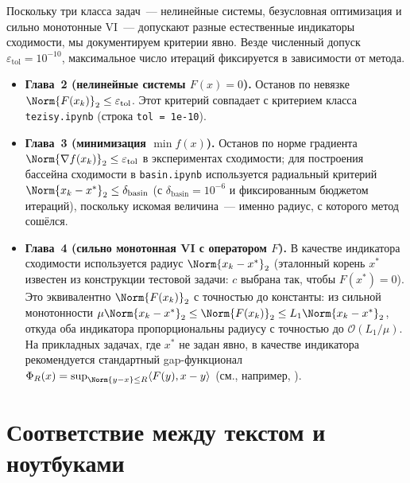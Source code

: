 Поскольку три класса задач~--- нелинейные системы, безусловная
оптимизация и сильно монотонные VI~--- допускают разные естественные
индикаторы сходимости, мы документируем критерии явно. Везде
численный допуск $\varepsilon_{\mathrm{tol}}=10^{-10}$, максимальное
число итераций фиксируется в зависимости от метода.
\begin{itemize}\itemsep0pt
  \item \textbf{Глава~2 (нелинейные системы $F(x)=0$).}
        Останов по невязке $\Norm{F(x_k)}_2 \le \varepsilon_{\mathrm{tol}}$.
        Этот критерий совпадает с критерием класса \texttt{tezisy.ipynb}
        (строка \verb|tol = 1e-10|).
  \item \textbf{Глава~3 (минимизация $\min f(x)$).}
        Останов по норме градиента $\Norm{\nabla f(x_k)}_2 \le \varepsilon_{\mathrm{tol}}$
        в экспериментах сходимости; для построения бассейна сходимости
        в \texttt{basin.ipynb} используется радиальный критерий
        $\Norm{x_k - x^{*}}_2 \le \delta_{\mathrm{basin}}$ (с
        $\delta_{\mathrm{basin}} = 10^{-6}$ и фиксированным бюджетом
        итераций), поскольку искомая величина~--- именно радиус,
        с которого метод сошёлся.
  \item \textbf{Глава~4 (сильно монотонная VI с оператором $F$).}
        В качестве индикатора сходимости используется радиус
        $\Norm{x_k - x^{*}}_2$ (эталонный корень $x^{*}$ известен из
        конструкции тестовой задачи: $c$ выбрана так, чтобы $F(x^{*})=0$).
        Это эквивалентно $\Norm{F(x_k)}_2$ с точностью до константы:
        из сильной монотонности $\mu\Norm{x_k-x^{*}}_2\le\Norm{F(x_k)}_2\le L_1\Norm{x_k-x^{*}}_2$,
        откуда оба индикатора пропорциональны радиусу с точностью
        до $\mathcal O(L_1/\mu)$. На прикладных задачах,
        где $x^{*}$ не задан явно, в качестве индикатора рекомендуется
        стандартный gap-функционал
        $\Phi_R(x)=\sup_{\Norm{y-x}\le R}\langle F(y),x-y\rangle$
        (см., например, \cite[\S 5]{Agafonov2024VIJI}).
\end{itemize}

\section{Соответствие между текстом и ноутбуками}

